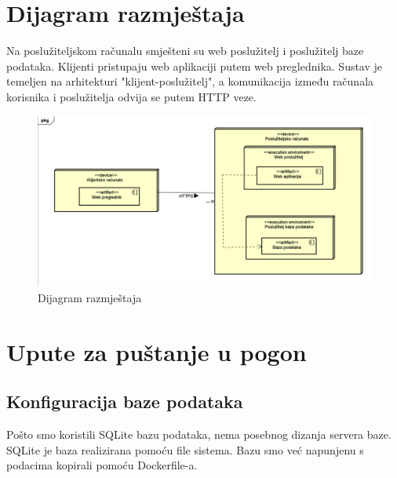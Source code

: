 		
		\section{Dijagram razmještaja}
			
			
			
			Na poslužiteljskom računalu smješteni su web poslužitelj i poslužitelj baze podataka. Klijenti pristupaju web aplikaciji putem web preglednika. Sustav je temeljen na arhitekturi "klijent-poslužitelj", a komunikacija između računala korisnika i poslužitelja odvija se putem HTTP veze.
			
			\begin{figure}[H]
				\includegraphics[width=\textwidth]{dijagram_razmjestaja.JPEG}
				\centering
				\caption{Dijagram razmještaja}
				\label{fig:dijagramrazmjestaja}
			\end{figure}
			
			\eject 
		
		\section{Upute za puštanje u pogon}
			\subsection{Konfiguracija baze podataka}
				Pošto smo koristili SQLite bazu podataka, nema posebnog dizanja servera baze. SQLite je baza realizirana pomoću file sistema. Bazu smo već napunjenu s podacima kopirali pomoću Dockerfile-a.

